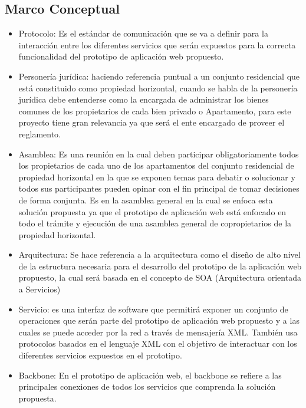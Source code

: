 \newpage

\subsection{Marco Conceptual}
\begin{itemize}
	
\item Protocolo: Es el estándar de comunicación que se va a definir para la interacción entre los diferentes servicios que serán expuestos para la correcta funcionalidad del prototipo de aplicación web propuesto.

\item Personería jurídica: haciendo referencia puntual a un conjunto residencial que está constituido como propiedad horizontal, cuando se habla de la personería jurídica debe entenderse como la encargada de administrar los bienes comunes de los propietarios de cada bien privado o Apartamento, para este proyecto tiene gran relevancia ya que será el ente encargado de proveer el reglamento.
  
\item Asamblea: Es una reunión en la cual deben participar obligatoriamente todos los propietarios de cada uno de los apartamentos del conjunto residencial de propiedad horizontal en la que se exponen temas para debatir o solucionar y todos sus participantes pueden opinar con el fin principal de tomar decisiones de forma conjunta. Es en la asamblea general en la cual se enfoca esta solución propuesta ya que el prototipo de aplicación web está enfocado en todo el trámite y ejecución de una asamblea general de copropietarios de la propiedad horizontal.

\item Arquitectura: Se hace referencia a la arquitectura como el diseño de alto nivel de la estructura necesaria para el desarrollo del prototipo de la aplicación web propuesto, la cual será basada en el concepto de SOA (Arquitectura orientada a Servicios)

\item Servicio: es una interfaz de software que  permitirá exponer un conjunto de operaciones que serán parte del prototipo de aplicación web propuesto y a las cuales se puede acceder por la red a través de mensajería XML. También usa protocolos basados en el lenguaje XML con el objetivo de interactuar con los diferentes servicios expuestos en el prototipo.

\item Backbone: En el prototipo de aplicación web, el backbone  se refiere a las principales conexiones de todos los servicios que comprenda la solución propuesta.


\end{itemize}
